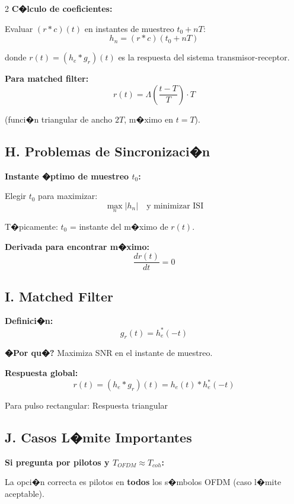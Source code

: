 ﻿\documentclass[8pt,a4paper]{article}
\begin{document}
\begin{multicols}{2}
\textbf{C�lculo de coeficientes:}

Evaluar $(r * c)(t)$ en instantes de muestreo $t_0 + nT$:
\[
h_n = (r * c)(t_0 + nT)
\]

donde $r(t) = (h_e * g_r)(t)$ es la respuesta del sistema transmisor-receptor.

\textbf{Para matched filter:}
\[
r(t) = \Lambda\left(\frac{t-T}{T}\right) \cdot T
\]

(funci�n triangular de ancho $2T$, m�ximo en $t=T$).

\vspace{-2mm}
\subsection*{\small H. Problemas de Sincronizaci�n}
\vspace{-2mm}

\textbf{Instante �ptimo de muestreo $t_0$:}

Elegir $t_0$ para maximizar:
\[
\max_{n} |h_n| \quad \text{y minimizar ISI}
\]

T�picamente: $t_0$ = instante del m�ximo de $r(t)$.

\textbf{Derivada para encontrar m�ximo:}
\[
\frac{dr(t)}{dt} = 0
\]

\vspace{-2mm}
\subsection*{\small I. Matched Filter}
\vspace{-2mm}

\textbf{Definici�n:}
\[
g_r(t) = h_e^*(-t)
\]

\textbf{�Por qu�?} Maximiza SNR en el instante de muestreo.

\textbf{Respuesta global:}
\[
r(t) = (h_e * g_r)(t) = h_e(t) * h_e^*(-t)
\]

Para pulso rectangular: Respuesta triangular

\vspace{-2mm}
\subsection*{\small J. Casos L�mite Importantes}
\vspace{-2mm}

\textbf{Si pregunta por pilotos y $T_{OFDM} \approx T_{coh}$:}

La opci�n correcta es pilotos en \textbf{todos} los s�mbolos OFDM (caso l�mite aceptable).


\end{multicols}
\end{document}
